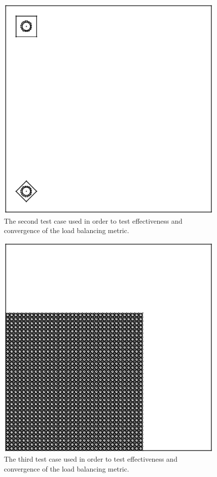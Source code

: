 \documentclass{anstrans}
\begin{document}
\begin{figure}
\centering
\includegraphics[scale = 0.5]{figures/unbalanced_pins_same_side.eps}
\caption{The second test case used in order to test effectiveness and convergence of the load balancing metric.}
\label{same}
\end{figure}


\begin{figure}
\centering
\includegraphics[scale = 0.5]{figures/lattice-12-shifted.eps}
\caption{The third test case used in order to test effectiveness and convergence of the load balancing metric.}
\label{lattice}
\end{figure}
\end{document}
